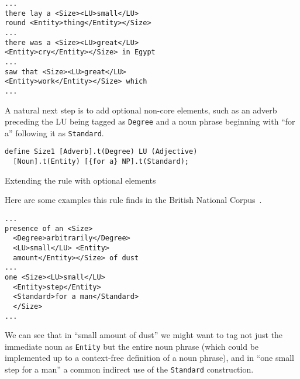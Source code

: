 \documentclass{llncs}
\begin{document}
\hfill \break
  \small
  \begin{framed}
\begin{verbatim}
...
there lay a <Size><LU>small</LU>
round <Entity>thing</Entity></Size>
...
there was a <Size><LU>great</LU>
<Entity>cry</Entity></Size> in Egypt
...
saw that <Size><LU>great</LU>
<Entity>work</Entity></Size> which
...
\end{verbatim}
\end{framed}
\normalsize

A natural next step is to add optional non-core elements, such as an adverb
preceding the LU being tagged as \verb+Degree+ and a noun phrase beginning with
``for a'' following it as \verb+Standard+.

\begin{table}[h]
  \small
  \begin{framed}
\begin{verbatim}
define Size1 [Adverb].t(Degree) LU (Adjective)
  [Noun].t(Entity) [{for a} NP].t(Standard);
\end{verbatim}
\end{framed}
\normalsize
\caption{Extending the rule with optional elements}
\end{table}

Here are some examples this rule finds in the British National
Corpus~\cite{bnc}.

  \small
  \begin{framed}
\begin{verbatim}
...
presence of an <Size>
  <Degree>arbitrarily</Degree>
  <LU>small</LU> <Entity>
  amount</Entity></Size> of dust
...
one <Size><LU>small</LU>
  <Entity>step</Entity>
  <Standard>for a man</Standard>
  </Size>
...
\end{verbatim}
  \end{framed}
  \normalsize

We can see that in ``small amount of dust'' we might want to
tag not just the immediate noun as \verb+Entity+ but the entire noun phrase
(which could be implemented up to a context-free definition of a noun phrase),
and in ``one small step for a man'' a common indirect use of the \verb+Standard+
construction.
\end{document}
